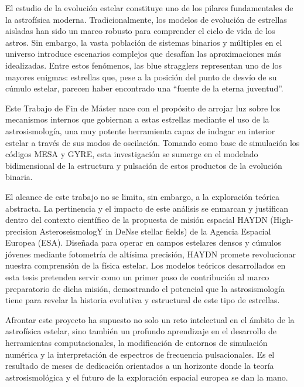 El estudio de la evolución estelar constituye uno de los pilares fundamentales de la astrofísica moderna. Tradicionalmente, los modelos de evolución de estrellas aisladas han sido un marco robusto para comprender el ciclo de vida de los astros. Sin embargo, la vasta población de sistemas binarios y múltiples en el universo introduce escenarios complejos que desafían las aproximaciones más idealizadas. Entre estos fenómenos, las blue stragglers representan uno de los mayores enigmas: estrellas que, pese a la posición del punto de desvío de su cúmulo estelar, parecen haber encontrado una ``fuente de la eterna juventud''.

Este Trabajo de Fin de Máster nace con el propósito de arrojar luz sobre los mecanismos internos que gobiernan a estas estrellas mediante el uso de la astrosismología, una muy potente herramienta capaz de indagar en interior estelar a través de sus modos de oscilación. Tomando como base de simulación los códigos MESA y GYRE, esta investigación se sumerge en el modelado bidimensional de la estructura y pulsación de estos productos de la evolución binaria.

El alcance de este trabajo no se limita, sin embargo, a la exploración teórica abstracta. La pertinencia y el impacto de este análisis se enmarcan y justifican dentro del contexto científico de la propuesta de misión espacial HAYDN (High-precision AsteroseismologY in DeNse stellar fields) de la Agencia Espacial Europea (ESA). Diseñada para operar en campos estelares densos y cúmulos jóvenes mediante fotometría de altísima precisión, HAYDN promete revolucionar nuestra comprensión de la física estelar. Los modelos teóricos desarrollados en esta tesis pretenden servir como un primer paso de contribución al marco preparatorio de dicha misión, demostrando el potencial que la astrosismología tiene para revelar la historia evolutiva y estructural de este tipo de estrellas.

Afrontar este proyecto ha supuesto no solo un reto intelectual en el ámbito de la astrofísica estelar, sino también un profundo aprendizaje en el desarrollo de herramientas computacionales, la modificación de entornos de simulación numérica y la interpretación de espectros de frecuencia pulsacionales. Es el resultado de meses de dedicación orientados a un horizonte donde la teoría astrosismológica y el futuro de la exploración espacial europea se dan la mano.